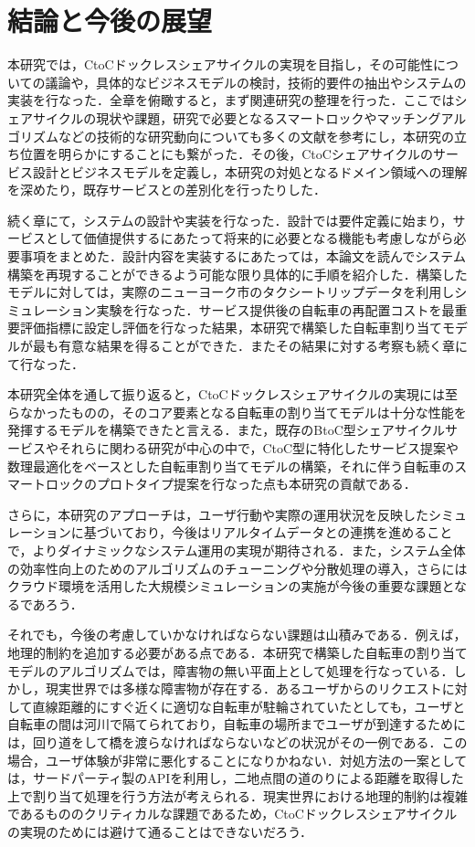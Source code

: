 \section{結論と今後の展望}
  \label{sec:結論と今後の展望}  
    \par 本研究では，CtoCドックレスシェアサイクルの実現を目指し，その可能性についての議論や，具体的なビジネスモデルの検討，技術的要件の抽出やシステムの実装を行なった．全章を俯瞰すると，まず関連研究の整理を行った．ここではシェアサイクルの現状や課題，研究で必要となるスマートロックやマッチングアルゴリズムなどの技術的な研究動向についても多くの文献を参考にし，本研究の立ち位置を明らかにすることにも繋がった．その後，CtoCシェアサイクルのサービス設計とビジネスモデルを定義し，本研究の対処となるドメイン領域への理解を深めたり，既存サービスとの差別化を行ったりした．
    \par 続く章にて，システムの設計や実装を行なった．設計では要件定義に始まり，サービスとして価値提供するにあたって将来的に必要となる機能も考慮しながら必要事項をまとめた．設計内容を実装するにあたっては，本論文を読んでシステム構築を再現することができるよう可能な限り具体的に手順を紹介した．構築したモデルに対しては，実際のニューヨーク市のタクシートリップデータを利用しシミュレーション実験を行なった．サービス提供後の自転車の再配置コストを最重要評価指標に設定し評価を行なった結果，本研究で構築した自転車割り当てモデルが最も有意な結果を得ることができた．またその結果に対する考察も続く章にて行なった．
    \par 本研究全体を通して振り返ると，CtoCドックレスシェアサイクルの実現には至らなかったものの，そのコア要素となる自転車の割り当てモデルは十分な性能を発揮するモデルを構築できたと言える．また，既存のBtoC型シェアサイクルサービスやそれらに関わる研究が中心の中で，CtoC型に特化したサービス提案や数理最適化をベースとした自転車割り当てモデルの構築，それに伴う自転車のスマートロックのプロトタイプ提案を行なった点も本研究の貢献である．
    \par さらに，本研究のアプローチは，ユーザ行動や実際の運用状況を反映したシミュレーションに基づいており，今後はリアルタイムデータとの連携を進めることで，よりダイナミックなシステム運用の実現が期待される．また，システム全体の効率性向上のためのアルゴリズムのチューニングや分散処理の導入，さらにはクラウド環境を活用した大規模シミュレーションの実施が今後の重要な課題となるであろう．
    \par それでも，今後の考慮していかなければならない課題は山積みである．例えば，地理的制約を追加する必要がある点である．本研究で構築した自転車の割り当てモデルのアルゴリズムでは，障害物の無い平面上として処理を行なっている．しかし，現実世界では多様な障害物が存在する．あるユーザからのリクエストに対して直線距離的にすぐ近くに適切な自転車が駐輪されていたとしても，ユーザと自転車の間は河川で隔てられており，自転車の場所までユーザが到達するためには，回り道をして橋を渡らなければならないなどの状況がその一例である．この場合，ユーザ体験が非常に悪化することになりかねない．対処方法の一案としては，サードパーティ製のAPIを利用し，二地点間の道のりによる距離を取得した上で割り当て処理を行う方法が考えられる．現実世界における地理的制約は複雑であるもののクリティカルな課題であるため，CtoCドックレスシェアサイクルの実現のためには避けて通ることはできないだろう．
